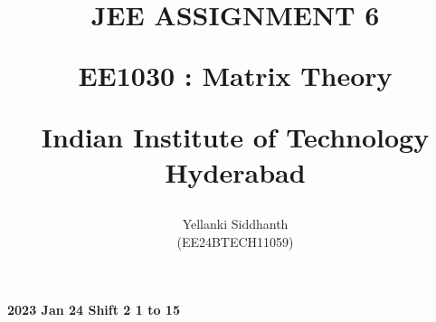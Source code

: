 \documentclass[journal]{IEEEtran}
\begin{document}

\onecolumn
\title{
JEE ASSIGNMENT 6

\large{EE1030 : Matrix Theory}

Indian Institute of Technology Hyderabad
}
\author{Yellanki Siddhanth

(EE24BTECH11059)
}	




\maketitle





\bigskip

\renewcommand{\thefigure}{\theenumi}
\renewcommand{\thetable}{\theenumi}
 
    
        \textbf{2023 Jan 24 Shift 2 1 to 15}
    
\end{document}

